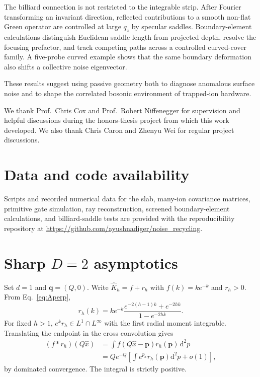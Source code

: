 \documentclass[aps,pra,twocolumn,superscriptaddress,longbibliography,nofootinbib,floatfix]{revtex4-2}
\theoremstyle{remark}
\newcommand{\dd}{\mathrm d}
\newcommand{\qvec}{\bm q}
\newcommand{\Khat}{\widehat K}
\begin{document}
The billiard connection is not restricted to the integrable strip.  After Fourier transforming an invariant direction, reflected contributions to a smooth non-flat Green operator are controlled at large $q_z$ by specular saddles.  Boundary-element calculations distinguish Euclidean saddle length from projected depth, resolve the focusing prefactor, and track competing paths across a controlled curved-cover family.  A five-probe curved example shows that the same boundary deformation also shifts a collective noise eigenvector.

These results suggest using passive geometry both to diagnose anomalous surface noise and to shape the correlated bosonic environment of trapped-ion hardware.

\begin{acknowledgments}
We thank Prof.~Chris Cox and Prof.~Robert Niffenegger for supervision and helpful discussions during the honors-thesis project from which this work developed.  We also thank Chris Caron and Zhenyu Wei for regular project discussions.
\end{acknowledgments}

\section*{Data and code availability}
Scripts and recorded numerical data for the slab, many-ion covariance matrices, primitive gate simulation, ray reconstruction, screened boundary-element calculations, and billiard-saddle tests are provided with the reproducibility repository at \url{https://github.com/ayushnadiger/noise_recycling}.

\appendix

\section{Sharp \texorpdfstring{$D=2$}{D=2} asymptotics}
\label{app:sharp}

Set $d=1$ and $\qvec=(Q,0)$.  Write $\Khat_h=f+r_h$ with $f(k)=ke^{-k}$ and $r_h>0$.  From Eq.~\eqref{eq:Aperp},
\begin{equation}
r_h(k)=ke^{-k}\frac{e^{-2(h-1)k}+e^{-2hk}}{1-e^{-2hk}}.
\end{equation}
For fixed $h>1$, $e^k r_h\in L^1\cap L^\infty$ with the first radial moment integrable.  Translating the endpoint in the cross convolution gives
\begin{align}
(f*r_h)(Q\hat x)
&=\int f(Q\hat x-\bm p)r_h(\bm p)\,\dd^2p\nonumber\\
&=Qe^{-Q}\left[\int e^{p_x}r_h(\bm p)\dd^2p+o(1)\right],
\end{align}
by dominated convergence.  The integral is strictly positive.
\end{document}
